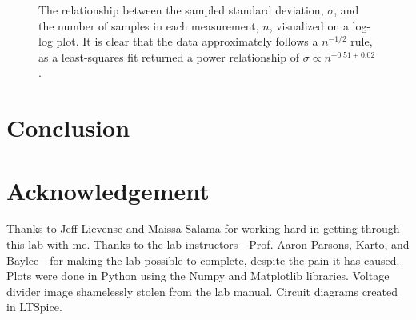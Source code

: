 \documentclass[12pt]{article}
\begin{document}
\begin{figure}[H]
\caption[SODUMB]{The relationship between the sampled standard deviation, $\sigma$, and the number of samples in each measurement, $n$, visualized on a log-log plot. It is clear that the data approximately follows a $n^{-1/2}$ rule, as a least-squares fit returned a power relationship of $\sigma \propto n^{-0.51\pm0.02}$.}
\label{fig:n_scaling2}
\end{figure}


\section*{Conclusion}

\section*{Acknowledgement}
Thanks to Jeff Lievense and Maissa Salama for working hard in getting through this lab with me. Thanks to the lab instructors---Prof. Aaron Parsons, Karto, and Baylee---for making the lab possible to complete, despite the pain it has caused.
Plots were done in Python using the Numpy and Matplotlib libraries.
Voltage divider image shamelessly stolen from the lab manual.
Circuit diagrams created in LTSpice.

\begin{thebibliography}{1}

\end{thebibliography}
\end{document}
